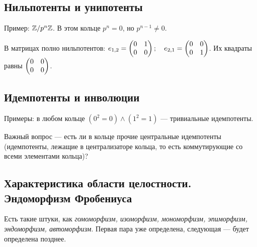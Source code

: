 \documentclass[a4paper]{report}
\begin{document}
    \subsection{Нильпотенты и унипотенты}
    Пример:
    $\mathbb{Z} / p^n\mathbb{Z}$.
    В этом кольце $p^n = 0$, но $p^{n - 1} \ne 0$.

    В матрицах полно нильпотентов: $e_{1,2} = \begin{pmatrix}0&1\\0&0\end{pmatrix}; \quad e_{2, 1} = \begin{pmatrix}0&0\\0&1\end{pmatrix}$.
    Их квадраты равны $\begin{pmatrix}0&0\\0&0\end{pmatrix}$.



    \subsection{Идемпотенты и инволюции}
    Примеры: в любом кольце $(0^2 = 0) \land (1^2 = 1)$ --- тривиальные идемпотенты.

    Важный вопрос --- есть ли в кольце прочие центральные идемпотенты (идемпотенты, лежащие в централизаторе кольца, то есть коммутирующие со всеми элементами кольца)?


    \subsection{Характеристика области целостности. Эндоморфизм Фробениуса}
    Есть такие штуки, как \emph{гомоморфизм, изоморфизм, мономорфизм, эпиморфизм, эндоморфизм, автоморфизм}.
    Первая пара уже определена, следующая --- будет определена позднее.
\end{document}
